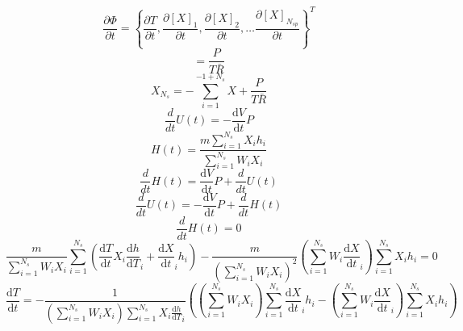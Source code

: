 \documentclass[a4paper,10pt]{article}
\begin{document}
\begin{equation}\frac{\partial \Phi}{\partial t} = \left\{\frac{\partial T}{\partial t}, \frac{\partial [X]_1}{\partial t}, \frac{\partial [X]_2}{\partial t}, \ldots \frac{\partial [X]_{N_{sp}}}{\partial t}\right\}^{T}\end{equation}
\begin{equation}[X] = \frac{P}{T \bar{R}}\end{equation}
\begin{equation}X_{N_s} = - \sum_{i=1}^{-1 + N_s} X + \frac{P}{T \bar{R}}\end{equation}
\begin{equation}\frac{d}{d t} U{\left (t \right )} = - \frac{\text{d} V }{\text{d} t } P\end{equation}
\begin{equation}H{\left (t \right )} = \frac{m \sum_{i=1}^{N_s} X_{i} h_{i}}{\sum_{i=1}^{N_s} W_{i} X_{i}}\end{equation}
\begin{equation}\frac{d}{d t} H{\left (t \right )} = \frac{\text{d} V }{\text{d} t } P + \frac{d}{d t} U{\left (t \right )}\end{equation}
\begin{equation}\frac{d}{d t} U{\left (t \right )} = - \frac{\text{d} V }{\text{d} t } P + \frac{d}{d t} H{\left (t \right )}\end{equation}
\begin{equation}\frac{d}{d t} H{\left (t \right )} = 0\end{equation}
\begin{equation}\frac{m}{\sum_{i=1}^{N_s} W_{i} X_{i}} \sum_{i=1}^{N_s} \left(\frac{\text{d} T }{\text{d} t } X_{i} \frac{\text{d} h }{\text{d} T }_{i} + \frac{\text{d} X }{\text{d} t }_{i} h_{i}\right) - \frac{m}{\left(\sum_{i=1}^{N_s} W_{i} X_{i}\right)^{2}} \left(\sum_{i=1}^{N_s} W_{i} \frac{\text{d} X }{\text{d} t }_{i}\right) \sum_{i=1}^{N_s} X_{i} h_{i} = 0\end{equation}
\begin{equation}\frac{\text{d} T }{\text{d} t } = - \frac{1}{\left(\sum_{i=1}^{N_s} W_{i} X_{i}\right) \sum_{i=1}^{N_s} X_{i} \frac{\text{d} h }{\text{d} T }_{i}} \left(\left(\sum_{i=1}^{N_s} W_{i} X_{i}\right) \sum_{i=1}^{N_s} \frac{\text{d} X }{\text{d} t }_{i} h_{i} - \left(\sum_{i=1}^{N_s} W_{i} \frac{\text{d} X }{\text{d} t }_{i}\right) \sum_{i=1}^{N_s} X_{i} h_{i}\right)\end{equation}
\end{document}
